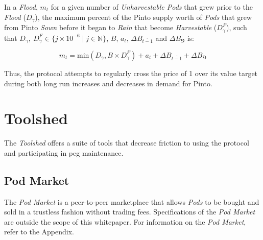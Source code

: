 \documentclass[tikz]{article}
\newcommand{\term}[1]{\textsl{#1}}
\newcommand{\Pinto}{} %
\begin{document}
\vspace{-0.05cm}

In a \term{Flood}, $m_{t}$ for a given number of \term{Unharvestable Pods} that grew prior to the \term{Flood} ($D_{\gamma}$), the maximum percent of the Pinto supply worth of \term{Pods} that grew from Pinto \term{Sown} before it began to \term{Rain} that become \term{Harvestable} ($D_{\gamma}^{F}$), such that $D_{\gamma},\ D_{\gamma}^{F} \in \{j \times 10^{-6} \mid j \in \mathbb{N} \}$, $B$, $a_{t}$, $\Delta B_{\overline{t-1}}$ and $\Delta B_{\Game}$ is:

\vspace{-0.05cm}

    $$
        m_{t} = 
            \text{min}(D_\gamma, B \times D_{\gamma}^{F}) + 
            a_{t} + 
            \Delta B_{\overline{t-1}} + 
            \Delta B_{\Game}
    $$

\vspace{-0.05cm}

Thus, the protocol attempts to regularly cross the price of \Pinto1 over its value target during both long run increases and decreases in demand for Pinto.


\section{Toolshed}
\vspace{0.1cm}

The \term{Toolshed} offers a suite of tools that decrease friction to using the protocol and participating in peg maintenance.


\vspace{0.1cm}
\subsection{Pod Market}
\vspace{0.1cm}

The \term{Pod Market} is a peer-to-peer marketplace that allows \term{Pods} to be bought and sold in a trustless fashion without trading fees. Specifications of the \term{Pod Market} are outside the scope of this whitepaper. For information on the \term{Pod Market}, refer to the Appendix.

\end{document}
